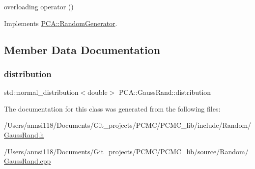 overloading operator () 



Implements \hyperlink{class_p_c_a_1_1_random_generator_a4361e39397900ae1e7b2cfa91a592509}{P\+C\+A\+::\+Random\+Generator}.



\subsection{Member Data Documentation}
\hypertarget{class_p_c_a_1_1_gauss_rand_a2a3c5494238db1cc94c2408227d9dbed}{}\label{class_p_c_a_1_1_gauss_rand_a2a3c5494238db1cc94c2408227d9dbed} 
\subsubsection{\texorpdfstring{distribution}{distribution}}
{\footnotesize\ttfamily std\+::normal\+\_\+distribution$<$double$>$ P\+C\+A\+::\+Gauss\+Rand\+::distribution\hspace{0.3cm}{\ttfamily [private]}}



The documentation for this class was generated from the following files\+:\begin{DoxyCompactItemize}
\item 
/\+Users/annsi118/\+Documents/\+Git\+\_\+projects/\+P\+C\+M\+C/\+P\+C\+M\+C\+\_\+lib/include/\+Random/\hyperlink{_gauss_rand_8h}{Gauss\+Rand.\+h}\item 
/\+Users/annsi118/\+Documents/\+Git\+\_\+projects/\+P\+C\+M\+C/\+P\+C\+M\+C\+\_\+lib/source/\+Random/\hyperlink{_gauss_rand_8cpp}{Gauss\+Rand.\+cpp}\end{DoxyCompactItemize}
